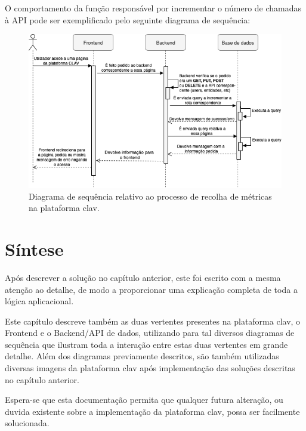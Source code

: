O comportamento da função responsável por incrementar o número de chamadas à API pode ser exemplificado pelo seguinte diagrama de sequência:

\begin{figure}[H]
    \centering
    \includegraphics[width=\textwidth]{img/diagramas/sequencia/DiagramasSequencia-Metrica.png}
    \caption{Diagrama de sequência relativo ao processo de recolha de métricas na plataforma \gls{clav}.}
    \label{fig:diagramaSequenciaMetrica}
\end{figure}

\vspace{-8mm}
\section{Síntese}
\vspace{-4mm}
Após descrever a solução no capítulo anterior, este foi escrito com a mesma atenção ao detalhe, de modo a proporcionar uma explicação completa de toda a lógica aplicacional.

Este capítulo descreve também as duas vertentes presentes na plataforma \gls{clav}, o Frontend e o Backend/API de dados, utilizando para tal diversos diagramas de sequência que ilustram toda a interação entre estas duas vertentes em grande detalhe. Além dos diagramas previamente descritos, são também utilizadas diversas imagens da plataforma \gls{clav} após implementação das soluções descritas no capítulo anterior.

Espera-se que esta documentação permita que qualquer futura alteração, ou duvida existente sobre a implementação da plataforma \gls{clav}, possa ser facilmente solucionada.
